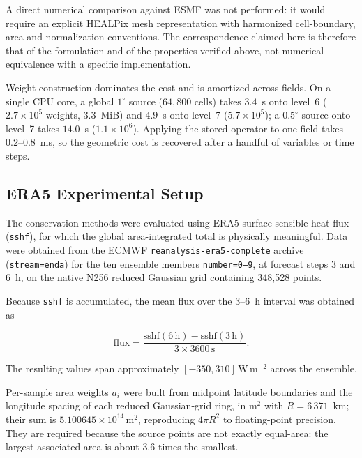 \documentclass[journal]{IEEEtran}
\newcommand{\healpix}{HEALPix\xspace}
\begin{document}
A direct numerical comparison against ESMF was not performed: it
would require an explicit \healpix mesh representation with
harmonized cell-boundary, area and normalization conventions. The correspondence claimed here is therefore that of
the formulation and of the properties verified above, not
numerical equivalence with a specific implementation.

Weight construction dominates the cost and is amortized across
fields. On a single CPU core, a global $1^\circ$ source
($64{,}800$ cells) takes $3.4$~s onto level~6
($2.7\times10^{5}$ weights, $3.3$~MiB) and $4.9$~s onto level~7
($5.7\times10^{5}$); a $0.5^\circ$ source onto level~7 takes
$14.0$~s ($1.1\times10^{6}$). Applying the stored operator to one
field takes $0.2$--$0.8$~ms, so the geometric cost is recovered
after a handful of variables or time steps.

\subsection{ERA5 Experimental Setup}
\label{sec:era5_experiment}

The conservation methods were evaluated using ERA5 surface
sensible heat flux (\texttt{sshf}), for which the global
area-integrated total is physically meaningful. Data were obtained
from the ECMWF \texttt{reanalysis-era5-complete} archive
(\texttt{stream=enda}) for the ten ensemble members
\texttt{number=0--9}, at forecast steps 3 and 6~h, on the native
N256 reduced Gaussian grid containing 348{,}528 points.

Because \texttt{sshf} is accumulated, the mean flux over the
3--6~h interval was obtained as

\begin{equation}
\mathrm{flux}
=
\frac{
\mathrm{sshf}(6\,\mathrm h)-\mathrm{sshf}(3\,\mathrm h)
}{
3\times3600\,\mathrm s
}.
\label{eq:deaccum}
\end{equation}

The resulting values span approximately
$[-350,310]\,\mathrm{W\,m^{-2}}$ across the ensemble.

Per-sample area weights $a_i$ were built from midpoint latitude
boundaries and the longitude spacing of each reduced
Gaussian-grid ring, in $\mathrm{m^2}$ with $R=6\,371$~km; their sum
is $5.100645\times10^{14}\,\mathrm{m^2}$, reproducing $4\pi R^2$ to
floating-point precision. They are required because
the source points are not exactly equal-area: the largest
associated area is about $3.6$ times the smallest.
\end{document}
